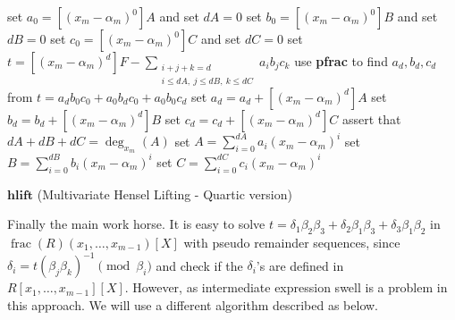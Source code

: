 \documentclass[11pt,reqno]{amsart}
\numberwithin{equation}{section}
\newcommand{\op}[1]  { \operatorname{ #1 }}
\begin{document}
\begin{algorithm}[H]
\DontPrintSemicolon
{}

set $a_0 = [(x_m - \alpha_m)^0] A$ and set $dA = 0$\;
set $b_0 = [(x_m - \alpha_m)^0] B$ and set $dB = 0$\;
set $c_0 = [(x_m - \alpha_m)^0] C$ and set $dC = 0$\;
\For{$d=1$ \KwTo $\op{deg}_{x_m}(A)$}
{
	set $t = [(x_m - \alpha_m)^d]F - \sum_{\substack{i+j+k=d \\ i \le dA, \ j \le dB, \ k \le dC}} a_i b_j c_k$\;
	use \textbf{pfrac} to find $a_d, b_d, c_d$ from $t=a_d b_0 c_0+a_0 b_d c_0+a_0 b_0 c_d$\;
	set $a_d = a_d + [(x_m - \alpha_m)^d]A$\;
	set $b_d = b_d + [(x_m - \alpha_m)^d]B$\;
	set $c_d = c_d + [(x_m - \alpha_m)^d]C$\;
	\lIf{$dA + dB + dC > \op{deg}_{x_m}(A)$}{\Return{FAIL}}
}
assert that $dA + dB + dC = \op{deg}_{x_m}(A)$\;
set $A = \sum_{i=0}^{dA} a_i (x_m - \alpha_m)^i$\;
set $B = \sum_{i=0}^{dB} b_i (x_m - \alpha_m)^i$\;
set $C = \sum_{i=0}^{dC} c_i (x_m - \alpha_m)^i$\;
\caption{$\textbf{hlift}$ (Multivariate Hensel Lifting - Quartic version)}
\label{algo_mlift2}
\end{algorithm}

Finally the main work horse. It is easy to solve
$t=\delta_1\beta_2\beta_3+\delta_2\beta_1\beta_3+\delta_3\beta_1\beta_2$ in
$\op{frac}(R)(x_1,\dots,x_{m-1})[X]$ with pseudo remainder sequences, since 
$\delta_i= t(\beta_j\beta_k)^{-1}\pmod {\beta_i}$ and check if the $\delta_i$'s
are  defined in $R[x_1,\dots, x_{m-1}][X]$. However, as intermediate expression
swell is a problem in this approach. We will use a different algorithm
described as below.
\end{document}
